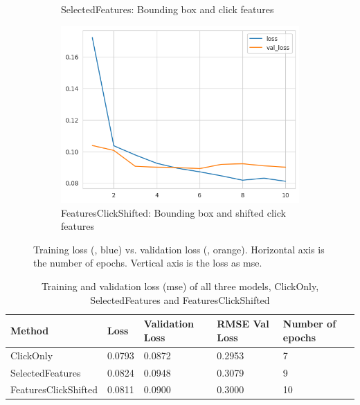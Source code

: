 \begin{figure}[htbp!]
\begin{subfigure}[b]{0.45\textwidth}
    \caption{SelectedFeatures: Bounding box and click features}
    \label{fig:model_history_loss_features}
  \end{subfigure}
  \hfill
  \begin{subfigure}[b]{0.8\textwidth}
    \centering
    \includegraphics[width=\textwidth]{graphics/model_history_loss_features_shifted}
    \caption{FeaturesClickShifted: Bounding box and shifted click features}
    \label{fig:model_history_loss_features_shifted}
  \end{subfigure}
  \caption[Training loss vs. validation loss]{Training loss (, blue) vs. validation loss (, orange). Horizontal axis is the number of epochs. Vertical axis is the loss as \gls{mse}.}
  \label{fig:model_history_losses}
\end{figure}

\begin{table}[htbp!]
  \small
  \centering
  \begin{tabular}{|l|l|l|l|l|}
    \hline
    \textbf{Method}      & \textbf{Loss} & \textbf{Validation Loss} & \textbf{RMSE Val Loss}   & \textbf{Number of epochs} \\
    \hline
    ClickOnly            & 0.0793        & 0.0872                   & 0.2953                   & 7                         \\
    SelectedFeatures     & 0.0824        & 0.0948                   & 0.3079                   & 9                         \\
    FeaturesClickShifted & 0.0811        & 0.0900                   & 0.3000                   & 10                        \\
    \hline
  \end{tabular}
  \caption[Training and validation loss, number of epochs]{Training and validation loss (\gls{mse}) of all three models, ClickOnly, SelectedFeatures and FeaturesClickShifted}
  \label{tab:model_losses}
\end{table}



